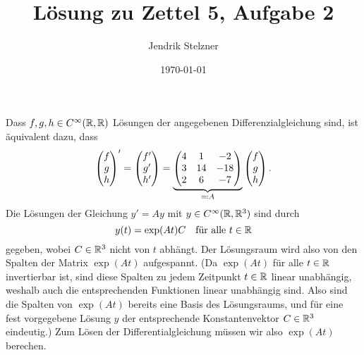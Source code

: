 \documentclass[a4paper, 10pt]{article}
\title{Lösung zu Zettel 5, Aufgabe 2}
\author{Jendrik Stelzner}
\date{\today}
\begin{document}
\maketitle


Dass $f,g,h \in C^\infty(\mathbb{R}, \mathbb{R})$ Lösungen der angegebenen Differenzialgleichung sind, ist äquivalent dazu, dass
\[
    \begin{pmatrix} f \\ g \\ h \end{pmatrix}'
  = \begin{pmatrix} f' \\ g' \\ h' \end{pmatrix}
  =
  \underbrace{
  \begin{pmatrix}
    4 &  1  &  -2 \\
    3 & 14  & -18 \\
    2 &  6  &  -7
  \end{pmatrix}
  }_{\eqqcolon A}
  \begin{pmatrix} f \\ g \\ h \end{pmatrix}.
\]
Die Lösungen der Gleichung $y' = A y$ mit $y \in C^\infty(\mathbb{R}, \mathbb{R}^3)$ sind durch
\[
  y(t) = \exp(At) C
  \quad
  \text{für alle $t \in \mathbb{R}$}
\]
gegeben, wobei $C \in \mathbb{R}^3$ nicht von $t$ abhängt.
Der Lösungsraum wird also von den Spalten der Matrix $\exp(At)$ aufgespannt.
(Da $\exp(At)$ für alle $t \in \mathbb{R}$ invertierbar ist, sind diese Spalten zu jedem Zeitpunkt $t \in \mathbb{R}$ linear unabhängig, weshalb auch die entsprechenden Funktionen linear unabhängig sind.
Also sind die Spalten von $\exp(At)$ bereits eine Basis des Lösungsraums, und für eine fest vorgegebene Lösung $y$ der entsprechende Konstantenvektor $C \in \mathbb{R}^3$ eindeutig.)
Zum Lösen der Differentialgleichung müssen wir also $\exp(At)$ berechen.
\end{document}
